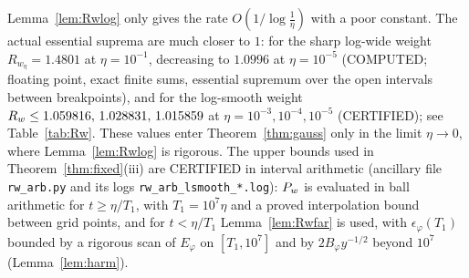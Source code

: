 \begin{remark}\label{rem:Rwnum}
Lemma~\ref{lem:Rwlog} only gives the rate $O(1/\log\frac1\eta)$ with a poor constant. The actual essential suprema are much
closer to $1$: for the sharp log-wide weight $R_{w_\eta}=1.4801$ at $\eta=10^{-1}$, decreasing to $1.0996$ at $\eta=10^{-5}$
(COMPUTED; floating point, exact finite sums, essential supremum over the open intervals between breakpoints), and for the
log-smooth weight $R_w\le1.059816,\,1.028831,\,1.015859$ at $\eta=10^{-3},10^{-4},10^{-5}$ (CERTIFIED); see Table~\ref{tab:Rw}.
These values enter Theorem~\ref{thm:gauss} only in the limit $\eta\to0$, where Lemma~\ref{lem:Rwlog} is rigorous. The upper bounds
used in Theorem~\ref{thm:fixed}(iii) are CERTIFIED in interval arithmetic (ancillary file \texttt{rw\_arb.py} and its logs
\texttt{rw\_arb\_lsmooth\_*.log}): $P_w$ is evaluated in ball arithmetic for $t\ge\eta/T_1$, with $T_1=10^7\eta$ and a proved
interpolation bound between grid points, and for $t<\eta/T_1$ Lemma~\ref{lem:Rwfar} is used, with $\epsilon_\varphi(T_1)$ bounded by
a rigorous scan of $E_\varphi$ on $[T_1,10^7]$ and by $2B_\varphi y^{-1/2}$ beyond $10^7$ (Lemma~\ref{lem:harm}).
\end{remark}

